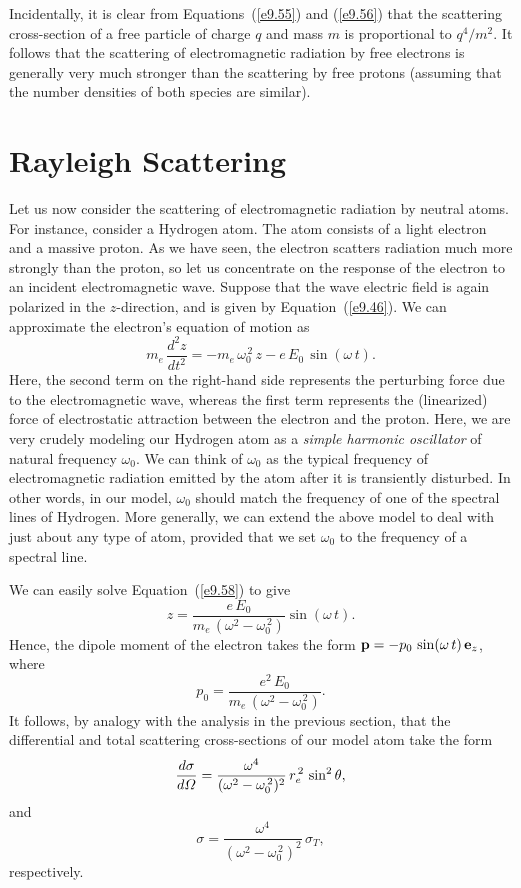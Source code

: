 Incidentally, it is clear from Equations~(\ref{e9.55}) and (\ref{e9.56}) that the scattering cross-section of a free particle of charge $q$ and mass $m$ is proportional to
$q^4/m^2$. It follows that the scattering of electromagnetic radiation  by free electrons is generally very much
stronger than the scattering by free protons  (assuming that the
number densities of both species are similar).

\section{Rayleigh Scattering}\label{s9.4}
Let us now consider the scattering of electromagnetic radiation by neutral
atoms. For instance, consider a Hydrogen atom. 
The atom consists of a light electron and a massive proton. As we have seen,
the electron scatters radiation much more strongly than the proton, so
let us concentrate on the  response of the electron to an incident electromagnetic
wave. Suppose that the wave electric field is again polarized in the
$z$-direction, and is given by Equation~(\ref{e9.46}). We can approximate
the electron's equation of motion as
\begin{equation}\label{e9.58}
m_e\,\frac{d^2 z}{dt^2} = - m_e\,\omega_0^{\,2}\,z - e\,E_0\,\sin(\omega\,t).
\end{equation}
Here, the second term on the right-hand side represents the perturbing
force due to the electromagnetic wave, whereas the first term represents
the (linearized) force of electrostatic attraction between the electron and the proton.
Here, we are very crudely modeling our Hydrogen atom as a
{\em simple harmonic oscillator}\/ of natural frequency $\omega_0$. 
We can think of $\omega_0$ as the typical frequency of electromagnetic
radiation emitted by the atom after it is transiently disturbed. In other words,
in our model,
$\omega_0$  should match the frequency of one of the spectral lines of
Hydrogen. More generally, we can extend the above model to deal
with just about any type of atom, provided that we set $\omega_0$
to the frequency of a spectral line.


We can easily solve Equation~(\ref{e9.58}) to give
\begin{equation}
z = \frac{e\,E_0}{m_e\,(\omega^2-\omega_0^{\,2})} \sin(\omega\,t).
\end{equation}
Hence, the dipole moment of the electron takes the form
${\bf p} = - p_0\,\sin(\omega\,t)\,{\bf e}_z$, where
\begin{equation}
p_0 = \frac{e^2\,E_0}{m_e\,(\omega^2-\omega_0^{\,2})}.
\end{equation}
It follows, by analogy with the analysis in the previous section, that the differential
and total scattering cross-sections of our model atom take the form
\begin{equation}\label{e9.61}
\frac{d\sigma}{d{\mit\Omega}} = \frac{\omega^4}{(\omega^2-\omega_0^{\,2})^2}\,r_e^{\,2}\,\sin^2\theta,
\end{equation}
and
\begin{equation}\label{e9.62}
\sigma =  \frac{\omega^4}{(\omega^2-\omega_0^{\,2})^2}\,\sigma_T,
\end{equation}
respectively.

